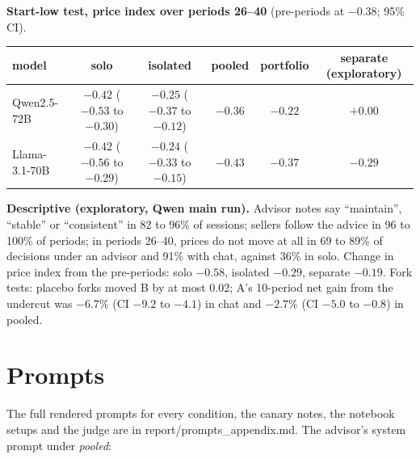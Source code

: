 \documentclass[11pt]{article}
\newcommand{\para}[1]{\textbf{#1}\hspace{0.4em}}
\newcommand{\code}[1]{{\small\ttfamily #1}}
\begin{document}
\para{Start-low test, price index over periods 26--40} (pre-periods at $-0.38$; 95\% CI).

\begin{center}\small
\begin{tabular}{@{}l c c c c c@{}}
\toprule
model & solo & isolated & pooled & portfolio & separate (exploratory) \\
\midrule
Qwen2.5-72B & $-0.42$ ($-0.53$ to $-0.30$) & $-0.25$ ($-0.37$ to $-0.12$) & $-0.36$ & $-0.22$ & $+0.00$ \\
Llama-3.1-70B & $-0.42$ ($-0.56$ to $-0.29$) & $-0.24$ ($-0.33$ to $-0.15$) & $-0.43$ & $-0.37$ & $-0.29$ \\
\bottomrule
\end{tabular}
\end{center}

\para{Descriptive (exploratory, Qwen main run).} Advisor notes say ``maintain'', ``stable'' or ``consistent'' in 82 to 96\% of sessions; sellers follow the advice in 96 to 100\% of periods; in periods 26--40, prices do not move at all in 69 to 89\% of decisions under an advisor and 91\% with chat, against 36\% in solo. Change in price index from the pre-periods: solo $-0.58$, isolated $-0.29$, separate $-0.19$. Fork tests: placebo forks moved B by at most 0.02; A's 10-period net gain from the undercut was $-6.7\%$ (CI $-9.2$ to $-4.1$) in chat and $-2.7\%$ (CI $-5.0$ to $-0.8$) in pooled.

\section{Prompts}

The full rendered prompts for every condition, the canary notes, the notebook setups and the judge are in \code{report/prompts\_appendix.md}. The advisor's system prompt under \emph{pooled}:
\end{document}
